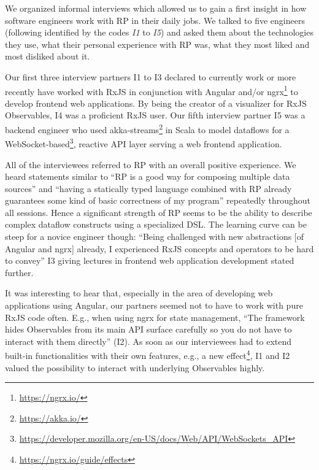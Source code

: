 \documentclass[12pt,a4paper]{article}
\begin{document}
We organized informal interviews which allowed us to gain a first insight in how software engineers work with RP in their daily jobs. We talked to five engineers (following identified by the codes \emph{I1} to \emph{I5}) and asked them about the technologies they use, what their personal experience with RP was, what they most liked and most disliked about it.

Our first three interview partners I1 to I3 declared to currently work or more recently have worked with RxJS in conjunction with Angular and/or ngrx\footnote{\url{https://ngrx.io/}} to develop frontend web applications. By being the creator of a visualizer for RxJS Observables, I4 was a proficient RxJS user. Our fifth interview partner I5 was a backend engineer who used akka-streams\footnote{\url{https://akka.io/}} in Scala to model dataflows for a WebSocket-based\footnote{\url{https://developer.mozilla.org/en-US/docs/Web/API/WebSockets_API}}, reactive API layer serving a web frontend application.

All of the interviewees referred to RP with an overall positive experience. We heard statements similar to ``RP is a good way for composing multiple data sources'' and ``having a statically typed language combined with RP already guarantees some kind of basic correctness of my program'' repeatedly throughout all sessions. Hence a significant strength of RP seems to be the ability to describe complex dataflow constructs using a specialized DSL. The learning curve can be steep for a novice engineer though: ``Being challenged with new abstractions [of Angular and ngrx] already, I experienced RxJS concepts and operators to be hard to convey'' I3 giving lectures in frontend web application development stated further.

It was interesting to hear that, especially in the area of developing web applications using Angular, our partners seemed not to have to work with pure RxJS code often. E.g., when using ngrx for state management, ``The framework hides Observables from its main API surface carefully so you do not have to interact with them directly'' (I2). As soon as our interviewees had to extend built-in functionalities with their own features, e.g., a new effect\footnote{\url{https://ngrx.io/guide/effects}}, I1 and I2 valued the possibility to interact with underlying Observables highly.
\end{document}
